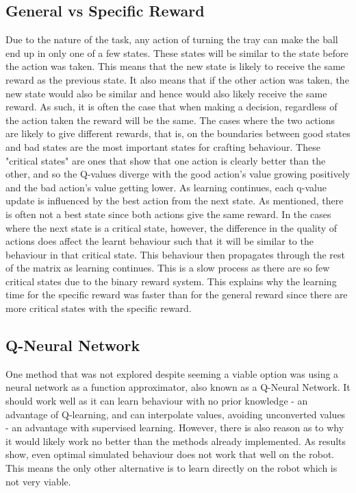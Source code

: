 \documentclass[12pt,a4paper]{article}
\begin{document}
\subsection{General vs Specific Reward}
Due to the nature of the task, any action of turning the tray can make the ball end up in only one of a few states. These states will be similar to the state before the action was taken. This means that the new state is likely to receive the same reward as the previous state. It also means that if the other action was taken, the new state would also be similar and hence would also likely receive the same reward. As such, it is often the case that when making a decision, regardless of the action taken the reward will be the same. The cases where the two actions are likely to give different rewards, that is, on the boundaries between good states and bad states are the most important states for crafting behaviour. These "critical states" are ones that show that one action is clearly better than the other, and so the Q-values diverge with the good action's value growing positively and the bad action's value getting lower. As learning continues, each q-value update is influenced by the best action from the next state. As mentioned, there is often not a best state since both actions give the same reward. In the cases where the next state is a critical state, however, the difference in the quality of actions does affect the learnt behaviour such that it will be similar to the behaviour in that critical state. This behaviour then propagates through the rest of the matrix as learning continues. This is a slow process as there are so few critical states due to the binary reward system. This explains why the learning time for the specific reward was faster than for the general reward since there are more critical states with the specific reward.

\subsection{Q-Neural Network}
One method that was not explored despite seeming a viable option was using a neural network as a function approximator, also known as a Q-Neural Network. It should work well as it can learn behaviour with no prior knowledge - an advantage of Q-learning, and can interpolate values, avoiding unconverted values - an advantage with supervised learning. However, there is also reason as to why it would likely work no better than the methods already implemented. As results show, even optimal simulated behaviour does not work that well on the robot. This means the only other alternative is to learn directly on the robot which is not very viable.
\end{document}
